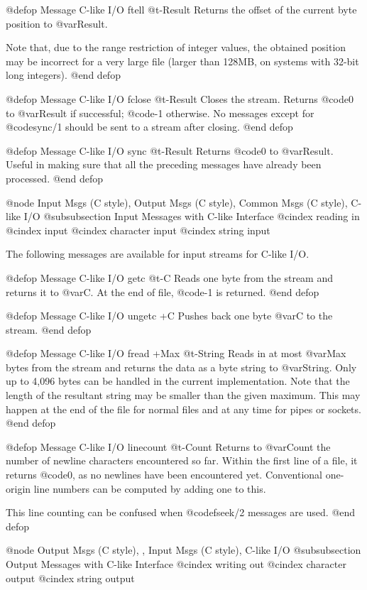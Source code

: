 {{{{@defop {Message} {C-like I/O} ftell @t{-}Result
Returns the offset of the current byte position to @var{Result}.

Note that, due to the range restriction of integer values, the obtained
position may be incorrect for a very large file (larger than 128MB, on
systems with 32-bit long integers).
@end defop

@defop {Message} {C-like I/O} fclose @t{-}Result
Closes the stream.  Returns @code{0} to @var{Result} if successful;
@code{-1} otherwise.  No messages except for @code{sync/1} should be
sent to a stream after closing.
@end defop

@defop {Message} {C-like I/O} sync @t{-}Result
Returns @code{0} to @var{Result}.  Useful in making sure that all the
preceding messages have already been processed.
@end defop

@node Input Msgs (C style), Output Msgs (C style), Common Msgs (C style), C-like I/O
@subsubsection Input Messages with C-like Interface
@cindex reading in
@cindex input
@cindex character input
@cindex string input

The following messages are available for input streams for C-like I/O.

@defop {Message} {C-like I/O} getc @t{-}C
Reads one byte from the stream and returns it to @var{C}.  At the end of
file, @code{-1} is returned.
@end defop

@defop {Message} {C-like I/O} ungetc +C
Pushes back one byte @var{C} to the stream.
@end defop

@defop {Message} {C-like I/O} fread +Max @t{-}String
Reads in at most @var{Max} bytes from the stream and returns the data as a
byte string to @var{String}.  Only up to 4,096 bytes can be handled in
the current implementation.  Note that the length of the resultant string
may be smaller than the given maximum.  This may happen at the end of
the file for normal files and at any time for pipes or sockets.
@end defop

@defop {Message} {C-like I/O} linecount @t{-}Count
Returns to @var{Count} the number of newline characters encountered so
far.  Within the first line of a file, it returns @code{0}, as no
newlines have been encountered yet.  Conventional one-origin line
numbers can be computed by adding one to this.

This line counting can be confused when @code{fseek/2} messages are
used.
@end defop

@node Output Msgs (C style),  , Input Msgs (C style), C-like I/O
@subsubsection Output Messages with C-like Interface
@cindex writing out
@cindex character output
@cindex string output

}}}}
